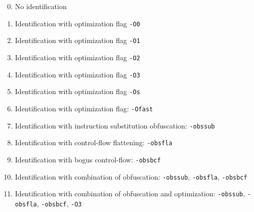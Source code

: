 \begin{enumerate}
\setcounter{enumi}{-1}
\item No identification
\item Identification with optimization flag \texttt{-O0}
\item Identification with optimization  flag \texttt{-O1}
\item Identification with optimization flag \texttt{-O2}
\item Identification with optimization flag \texttt{-O3}
\item Identification with optimization flag \texttt{-Os}
\item Identification with optimization flag: \texttt{-Ofast}
\item Identification with instruction substitution obfuscation: \texttt{-obs\textunderscore sub}
\item Identification with control-flow flattening: \texttt{-obs\textunderscore fla}
\item Identification with bogus control-flow: \texttt{-obs\textunderscore bcf}
\item Identification with combination of obfuscation: \texttt{-obs\textunderscore sub}, \texttt{-obs\textunderscore fla}, \texttt{-obs\textunderscore bcf}
\item Identification with combination of obfuscation and optimization: \texttt{-obs\textunderscore sub}, \texttt{-obs\textunderscore fla}, \texttt{-obs\textunderscore bcf}, \texttt{-O3}
\end{enumerate}





